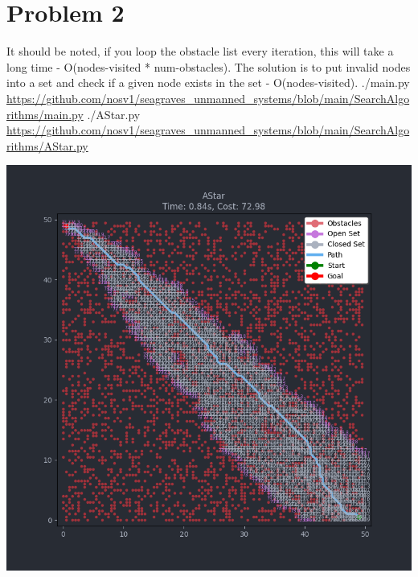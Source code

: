 \documentclass{article}
\begin{document}
        \section*{Problem 2}
            \begin{minipage}{\linewidth}
                \raggedright
                It should be noted, if you loop the obstacle list every iteration, this will take a long time - O(nodes-visited * num-obstacles). The solution is to put invalid nodes into a set and check if a given node exists in the set - O(nodes-visited). \break 
                \break
                ./main.py \break
                \url{https://github.com/nosv1/seagraves_unmanned_systems/blob/main/SearchAlgorithms/main.py} \break
                ./AStar.py \break
                \url{https://github.com/nosv1/seagraves_unmanned_systems/blob/main/SearchAlgorithms/AStar.py}
                \begin{center}
                    \includegraphics[width=\linewidth]{HW3P2 AStar.png}
                \end{center}
            \end{minipage}
\end{document}
